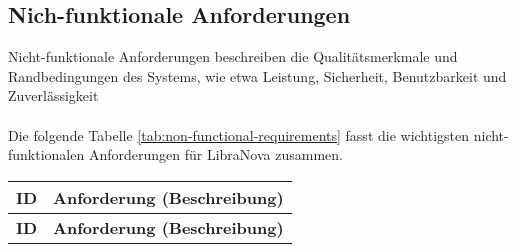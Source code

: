 \subsection{Nich-funktionale Anforderungen}
Nicht-funktionale Anforderungen beschreiben die Qualitätsmerkmale und Randbedingungen des Systems, wie etwa Leistung, Sicherheit, Benutzbarkeit und Zuverlässigkeit\\ \\
Die folgende Tabelle \ref{tab:non-functional-requirements} fasst die wichtigsten nicht-funktionalen Anforderungen für LibraNova zusammen.

\begin{longtable}{|c|p{13cm}|}
	\hline
	\textbf{ID} & \textbf{Anforderung (Beschreibung)} \\
	\hline
	\endfirsthead
	
	\hline
	\textbf{ID} & \textbf{Anforderung (Beschreibung)} \\
	\hline
	\endhead
	

\end{longtable}
